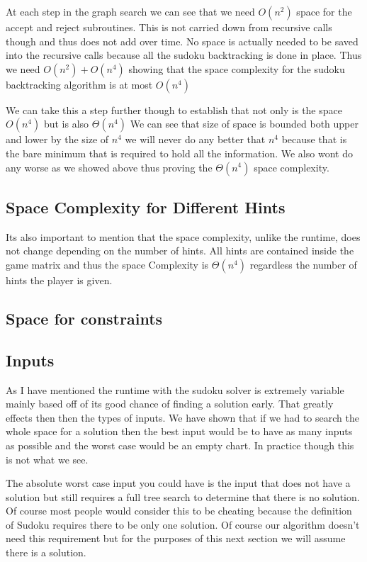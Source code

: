 \documentclass{sig-alternate}
\begin{document}
At each step in the graph search we can see that we need $O(n^2)$ space for the accept and reject subroutines. This is not carried down from recursive calls though and thus does not add over time. No space is actually needed to be saved into the recursive calls because all the sudoku backtracking is done in place. Thus we need $O(n^2) + O(n^4)$ showing that the space complexity for the sudoku backtracking algorithm is at most $O(n^4)$

We can take this a step further though to establish that not only is the space $O(n^4)$ but is also $\Theta(n^4)$ We can see that size of space is bounded both upper and lower by the size of $n^4$ we will never do any better that $n^4$ because that is the bare minimum that is required to hold all the information. We also wont do any worse as we showed above thus proving the $\Theta(n^4)$ space complexity. 

\subsection{Space Complexity for Different Hints}
Its also important to mention that the space complexity, unlike the runtime, does not change depending on the number of hints. All hints are contained inside the game matrix and thus the space Complexity is $\Theta(n^4)$ regardless the number of hints the player is given. 

\subsection{Space for constraints}

\subsection{Inputs} 

As I have mentioned the runtime with the sudoku solver is extremely variable mainly based off of its good chance of finding a solution early. That greatly effects then then the types of inputs. We have shown that if we had to search the whole space for a solution then the best input would be to have as many inputs as possible and the worst case would be an empty chart. In practice though this is not what we see. 

The absolute worst case input you could have is the input that does not have a solution but still requires a full tree search to determine that there is no solution. Of course most people would consider this to be cheating because the definition of Sudoku requires there to be only one solution. Of course our algorithm doesn't need this requirement but for the purposes of this next section we will assume there is a solution. 
\end{document}
